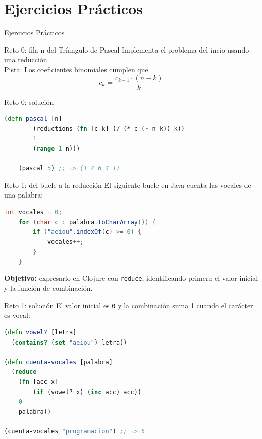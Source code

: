 \documentclass{beamer}
\begin{document}
\section{Ejercicios Prácticos}

\begin{emptyframe}
    Ejercicios Prácticos
\end{emptyframe}

\begin{frame}[fragile]{Reto 0: fila n del Tríangulo de Pascal}
    Implementa el problema del incio usando una reducción.\\ 

    Pista: Los coeficientes binomiales cumplen que
    $$c_k = \frac{c_{k-1} \cdot (n - k)}{k}$$
\end{frame}

\begin{frame}[fragile]{Reto 0: solución}
    \begin{lstlisting}[language=Clojure]
    (defn pascal [n]
        (reductions (fn [c k] (/ (* c (- n k)) k))
        1
        (range 1 n)))

    (pascal 5) ;; => (1 4 6 4 1)
    \end{lstlisting}
\end{frame}

\begin{frame}[fragile]{Reto 1: del bucle a la reducción}
    El siguiente bucle en Java cuenta las vocales de una palabra:

    \begin{lstlisting}[language=Java]
    int vocales = 0;
    for (char c : palabra.toCharArray()) {
        if ("aeiou".indexOf(c) >= 0) {
            vocales++;
        }
    }
    \end{lstlisting}

    \textbf{Objetivo:} expresarlo en Clojure con \texttt{reduce}, identificando primero el valor inicial y la función de combinación.
\end{frame}

\begin{frame}[fragile]{Reto 1: solución}
    El valor inicial es \texttt{0} y la combinación suma 1 cuando el carácter es vocal:

    \begin{lstlisting}[language=Clojure]
(defn vowel? [letra]
  (contains? (set "aeiou") letra))

(defn cuenta-vocales [palabra]
  (reduce 
    (fn [acc x] 
        (if (vowel? x) (inc acc) acc))
    0 
    palabra))

(cuenta-vocales "programacion") ;; => 5
    \end{lstlisting}
\end{frame}
\end{document}
